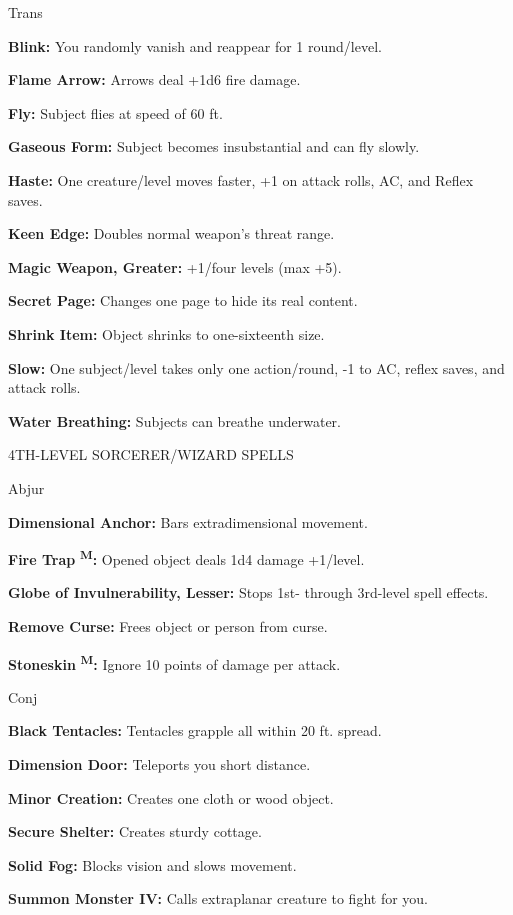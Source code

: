 \documentclass{article}
\begin{document}
Trans

\textbf{Blink:} You randomly vanish and reappear for 1 round/level.

\textbf{Flame Arrow:} Arrows deal +1d6 fire damage.

\textbf{Fly:} Subject flies at speed of 60 ft.

\textbf{Gaseous Form:} Subject becomes insubstantial and can fly slowly.

\textbf{Haste:} One creature/level moves faster, +1 on attack rolls, AC, and Reflex 
saves.

\textbf{Keen Edge:} Doubles normal weapon's threat range.

\textbf{Magic Weapon, Greater:} +1/four levels (max +5).

\textbf{Secret Page:} Changes one page to hide its real content.

\textbf{Shrink Item:} Object shrinks to one-sixteenth size.

\textbf{Slow:} One subject/level takes only one action/round, -1 to AC, reflex 
saves, and attack rolls.

\textbf{Water Breathing:} Subjects can breathe underwater.

4TH-LEVEL SORCERER/WIZARD SPELLS

Abjur

\textbf{Dimensional Anchor:} Bars extradimensional movement.

\textbf{Fire Trap }\textsuperscript{\textbf{M}}\textbf{:} Opened object deals 1d4 
damage +1/level.

\textbf{Globe of Invulnerability, Lesser:} Stops 1st- through 3rd-level spell effects.

\textbf{Remove Curse:} Frees object or person from curse.

\textbf{Stoneskin }\textsuperscript{\textbf{M}}\textbf{:} Ignore 10 points of damage 
per attack.

Conj

\textbf{Black Tentacles:} Tentacles grapple all within 20 ft. spread.

\textbf{Dimension Door:} Teleports you short distance.

\textbf{Minor Creation:} Creates one cloth or wood object.

\textbf{Secure Shelter:} Creates sturdy cottage.

\textbf{Solid Fog:} Blocks vision and slows movement.

\textbf{Summon Monster IV:} Calls extraplanar creature to fight for you.
\end{document}
